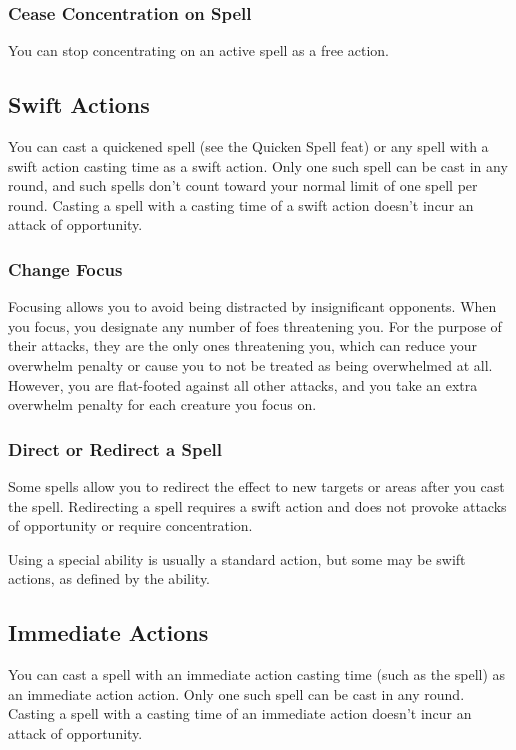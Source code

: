 \subsubsection{Cease Concentration on Spell}
You can stop concentrating on an active spell as a free action.

\subsection{Swift Actions}

You can cast a quickened spell (see the Quicken Spell feat) or any spell with a swift action casting time as a swift action. Only one such spell can be cast in any round, and such spells don't count toward your normal limit of one spell per round. Casting a spell with a casting time of a swift action doesn't incur an attack of opportunity.

\subsubsection{Change Focus}
Focusing allows you to avoid being distracted by insignificant opponents. When you focus, you designate any number of foes threatening you. For the purpose of their attacks, they are the only ones threatening you, which can reduce your overwhelm penalty or cause you to not be treated as being overwhelmed at all. However, you are flat-footed against all other attacks, and you take an extra  overwhelm penalty for each creature you focus on.

\subsubsection{Direct or Redirect a Spell}
Some spells allow you to redirect the effect to new targets or areas after you cast the spell. Redirecting a spell requires a swift action and does not provoke attacks of opportunity or require concentration.

Using a special ability is usually a standard action, but some may be swift actions, as defined by the ability.

\subsection{Immediate Actions}
You can cast a spell with an immediate action casting time (such as the  spell) as an immediate action action. Only one such spell can be cast in any round. Casting a spell with a casting time of an immediate action doesn't incur an attack of opportunity.

